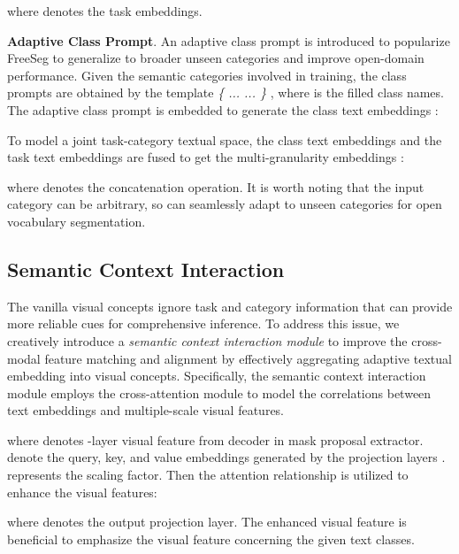 \documentclass[10pt,twocolumn,letterpaper]{article}
\begin{document}
where  denotes the task embeddings.



\textbf{Adaptive Class Prompt}. 
An adaptive class prompt is introduced to popularize FreeSeg to generalize to broader unseen categories and improve open-domain performance.
Given the semantic categories  involved in training, the class prompts  are obtained by the template \textit{\{  ...  ...   \} }, where  is the filled class names. 
The adaptive class prompt  is embedded to generate the class text embeddings :



To model a joint task-category textual space, the class text embeddings  and the task text embeddings  are fused to get the multi-granularity embeddings :

where  denotes the concatenation operation. 
It is worth noting that the input category can be arbitrary, so  can seamlessly adapt to unseen categories for open vocabulary segmentation.


\subsection{Semantic Context Interaction}
\label{sec: interaction}
The vanilla visual concepts ignore task and category information that can provide more reliable cues for comprehensive inference. To address this issue, we creatively introduce a \textit{semantic context interaction module} to improve the cross-modal feature matching and alignment by effectively aggregating adaptive textual embedding into visual concepts.
Specifically, the semantic context interaction module employs the cross-attention module to model the correlations between text embeddings and multiple-scale visual features.


where  denotes -layer visual feature from decoder in mask proposal extractor.
 denote the query, key, and value embeddings generated by the projection layers .  represents the scaling factor. Then the attention relationship is utilized to enhance the visual features:

where  denotes the output projection layer. The enhanced visual feature  is beneficial to emphasize the visual feature concerning the given text classes.
\end{document}

